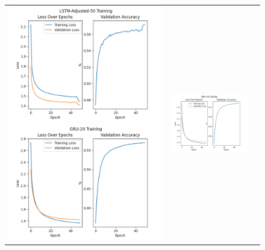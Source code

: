 \documentclass{article}
\begin{document}
\begin{enumerate}[label=1\alph*. ]
\begin{figure}[htb]
\begin{tabularx}{\textwidth}{XXX}
          \includegraphics{images/LSTM-Adjusted-50_training_new.png}
          \includegraphics{images/GRU-20_training_new.png} &
          \includegraphics{images/GRU-30_training_new.png} &

\end{tabularx}
\end{figure}
\end{enumerate}
\end{document}

